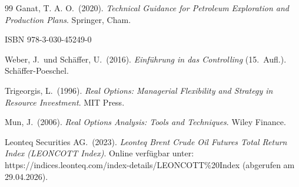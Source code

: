 \documentclass[11pt,a4paper]{article}
\begin{document}
\begin{thebibliography}{99}
Ganat, T. A. O.\ (2020).
\textit{Technical Guidance for Petroleum Exploration and Production Plans}.
Springer, Cham.

ISBN 978-3-030-45249-0

Weber, J.\ und Schäffer, U.\ (2016).
\textit{Einführung in das Controlling} (15.\ Aufl.).
Schäffer-Poeschel.

Trigeorgis, L.\ (1996).
\textit{Real Options: Managerial Flexibility and Strategy in Resource Investment}.
MIT Press.

Mun, J.\ (2006).
\textit{Real Options Analysis: Tools and Techniques}.
Wiley Finance.

Leonteq Securities AG.\ (2023).
\textit{Leonteq Brent Crude Oil Futures Total Return Index (LEONCOTT Index)}.
Online verfügbar unter: https://indices.leonteq.com/index-details/LEONCOTT\%20Index (abgerufen am 29.04.2026).

\end{thebibliography}

\vspace{1cm}
\end{document}
